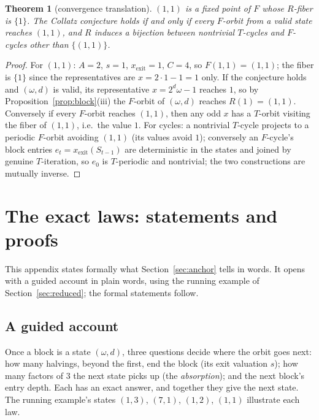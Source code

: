 \documentclass[11pt]{article}
\newtheorem{theorem}{Theorem}[section]
\theoremstyle{remark}
\newcommand{\w}{\omega}
\begin{document}
\begin{theorem}[convergence translation]\label{thm:equiv}
$(1,1)$ is a fixed point of $F$ whose $R$-fiber is $\{1\}$. The Collatz conjecture holds if and only if every $F$-orbit from a valid state reaches $(1,1)$, and $R$ induces a bijection between nontrivial $T$-cycles and $F$-cycles other than $\{(1,1)\}$.
\end{theorem}

\begin{proof}
For $(1,1)$: $A = 2$, $s = 1$, $x_{\mathrm{exit}} = 1$, $C = 4$, so $F(1,1) = (1,1)$; the fiber is $\{1\}$ since the representatives are $x = 2\cdot 1 - 1 = 1$ only. If the conjecture holds and $(\w,d)$ is valid, its representative $x = 2^d\w - 1$ reaches $1$, so by Proposition~\ref{prop:block}(iii) the $F$-orbit of $(\w,d)$ reaches $R(1) = (1,1)$. Conversely if every $F$-orbit reaches $(1,1)$, then any odd $x$ has a $T$-orbit visiting the fiber of $(1,1)$, i.e.\ the value $1$. For cycles: a nontrivial $T$-cycle projects to a periodic $F$-orbit avoiding $(1,1)$ (its values avoid $1$); conversely an $F$-cycle's block entries $e_t = x_{\mathrm{exit}}(S_{t-1})$ are deterministic in the states and joined by genuine $T$-iteration, so $e_0$ is $T$-periodic and nontrivial; the two constructions are mutually inverse.
\end{proof}

\section{The exact laws: statements and proofs}\label{app:laws}

This appendix states formally what Section~\ref{sec:anchor} tells in words. It opens with a guided account in plain words, using the running example of Section~\ref{sec:reduced}; the formal statements follow.

\subsection*{A guided account}

Once a block is a state $(\w,d)$, three questions decide where the orbit goes next: how many halvings, beyond the first, end the block (its exit valuation $s$); how many factors of $3$ the next state picks up (the \emph{absorption}); and the next block's entry depth. Each has an exact answer, and together they give the next state. The running example's states $(1,3)$, $(7,1)$, $(1,2)$, $(1,1)$ illustrate each law.
\end{document}
